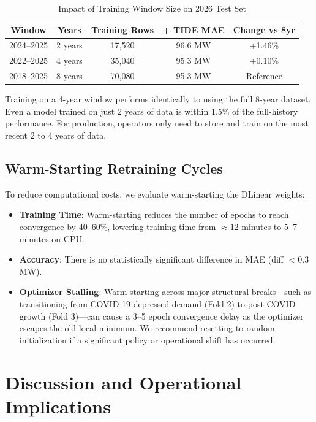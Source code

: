\documentclass[journal]{IEEEtran}
\begin{document}
\begin{table}[t]
\begin{table}[htbp]
\caption{Impact of Training Window Size on 2026 Test Set}
\label{tab:data_vol}
\centering
\begin{tabular}{ccccc}
\toprule
\textbf{Window} & \textbf{Years} & \textbf{Training Rows} & \textbf{+ TIDE MAE} & \textbf{Change vs 8yr} \\
\midrule
2024--2025 & 2 years & 17,520 & 96.6 MW & +1.46\% \\
2022--2025 & 4 years & 35,040 & 95.3 MW & +0.10\% \\
2018--2025 & 8 years & 70,080 & 95.3 MW & Reference \\
\bottomrule
\end{tabular}
\end{table}

Training on a 4-year window performs identically to using the full 8-year dataset. Even a model trained on just 2 years of data is within 1.5\% of the full-history performance. For production, operators only need to store and train on the most recent 2 to 4 years of data.

\subsection{Warm-Starting Retraining Cycles}
To reduce computational costs, we evaluate warm-starting the DLinear weights:
\begin{itemize}
    \item \textbf{Training Time}: Warm-starting reduces the number of epochs to reach convergence by 40--60\%, lowering training time from $\approx 12$ minutes to 5--7 minutes on CPU.
    \item \textbf{Accuracy}: There is no statistically significant difference in MAE (diff $< 0.3$ MW).
    \item \textbf{Optimizer Stalling}: Warm-starting across major structural breaks---such as transitioning from COVID-19 depressed demand (Fold 2) to post-COVID growth (Fold 3)---can cause a 3--5 epoch convergence delay as the optimizer escapes the old local minimum. We recommend resetting to random initialization if a significant policy or operational shift has occurred.
\end{itemize}

\section{Discussion and Operational Implications}


\end{table}
\end{document}

